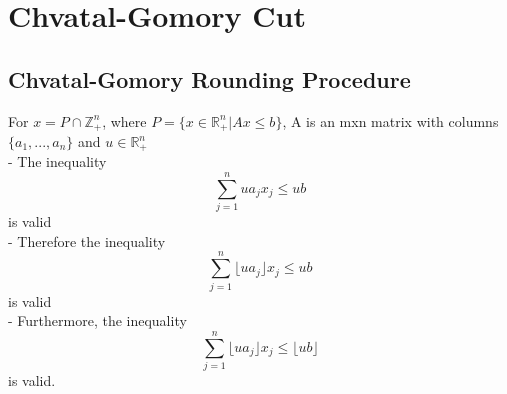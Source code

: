 		\section{Chvatal-Gomory Cut}
			\subsection{Chvatal-Gomory Rounding Procedure}
				For $x=P\cap \mathbb{Z}_+^n$, where $P=\{x\in \mathbb{R}_+^n|Ax \le b\}$, A is an mxn matrix with columns $\{a_1, ..., a_n\}$ and $u \in \mathbb{R}_+^n$\\
				- The inequality
				\begin{equation}
					\sum_{j=1}^n ua_jx_j\le ub 
				\end{equation}
				is valid\\
				- Therefore the inequality
				\begin{equation}
					\sum_{j=1}^n \lfloor ua_j \rfloor x_j \le ub 
				\end{equation}
				is valid\\
				- Furthermore, the inequality
				\begin{equation}
					\sum_{j=1}^n \lfloor ua_j \rfloor x_j \le \lfloor ub \rfloor 
				\end{equation}
				is valid.

